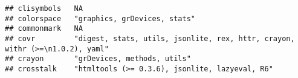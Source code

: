 \documentclass[]{book}
\begin{document}
\begin{verbatim}
## clisymbols   NA                                                                                                                                                                                                                                                                                                                                                                                                                                                                                                          
## colorspace   "graphics, grDevices, stats"                                                                                                                                                                                                                                                                                                                                                                                                                                                                                
## commonmark   NA                                                                                                                                                                                                                                                                                                                                                                                                                                                                                                          
## covr         "digest, stats, utils, jsonlite, rex, httr, crayon, withr (>=\n1.0.2), yaml"                                                                                                                                                                                                                                                                                                                                                                                                                                
## crayon       "grDevices, methods, utils"                                                                                                                                                                                                                                                                                                                                                                                                                                                                                 
## crosstalk    "htmltools (>= 0.3.6), jsonlite, lazyeval, R6"                                                                                                                                                                                                                                                                                                                                                                                                                                                              

\end{verbatim}
\end{document}
